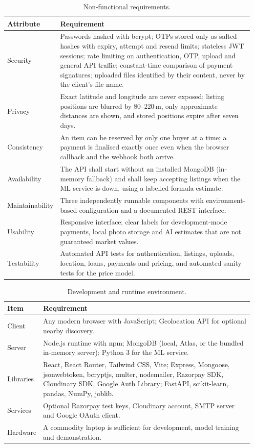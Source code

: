 \documentclass[12pt,letterpaper,twoside,openany]{report}
\begin{document}
\begin{table}[H]
\centering
\caption{Non-functional requirements.}\label{tab:nfr}
\small
\begin{tabularx}{\textwidth}{@{}L{2.6cm}X@{}}
\toprule
\textbf{Attribute} & \textbf{Requirement}\\
\midrule
Security & Passwords hashed with bcrypt; OTPs stored only as salted hashes with expiry, attempt and
resend limits; stateless JWT sessions; rate limiting on authentication, OTP, upload and general
API traffic; constant-time comparison of payment signatures; uploaded files identified by their
content, never by the client's file name.\\
Privacy & Exact latitude and longitude are never exposed; listing positions are blurred by 80--220\,m,
only approximate distances are shown, and stored positions expire after seven days.\\
Consistency & An item can be reserved by only one buyer at a time; a payment is finalised exactly once
even when the browser callback and the webhook both arrive.\\
Availability & The API shall start without an installed MongoDB (in-memory fallback) and shall keep
accepting listings when the ML service is down, using a labelled formula estimate.\\
Maintainability & Three independently runnable components with environment-based configuration and a
documented REST interface.\\
Usability & Responsive interface; clear labels for development-mode payments, local photo storage and
AI estimates that are not guaranteed market values.\\
Testability & Automated API tests for authentication, listings, uploads, location, loans, payments and
pricing, and automated sanity tests for the price model.\\
\bottomrule
\end{tabularx}
\end{table}

\begin{table}[H]
\centering
\caption{Development and runtime environment.}\label{tab:env}
\small
\begin{tabularx}{\textwidth}{@{}L{2.0cm}X@{}}
\toprule
\textbf{Item} & \textbf{Requirement}\\
\midrule
Client & Any modern browser with JavaScript; Geolocation API for optional nearby discovery.\\
Server & Node.js runtime with npm; MongoDB (local, Atlas, or the bundled in-memory server); Python 3
for the ML service.\\
Libraries & React, React Router, Tailwind CSS, Vite; Express, Mongoose, jsonwebtoken, bcryptjs, multer,
nodemailer, Razorpay SDK, Cloudinary SDK, Google Auth Library; FastAPI, scikit-learn, pandas,
NumPy, joblib.\\
Services & Optional Razorpay test keys, Cloudinary account, SMTP server and Google OAuth client.\\
Hardware & A commodity laptop is sufficient for development, model training and demonstration.\\
\bottomrule
\end{tabularx}
\end{table}
\end{document}
